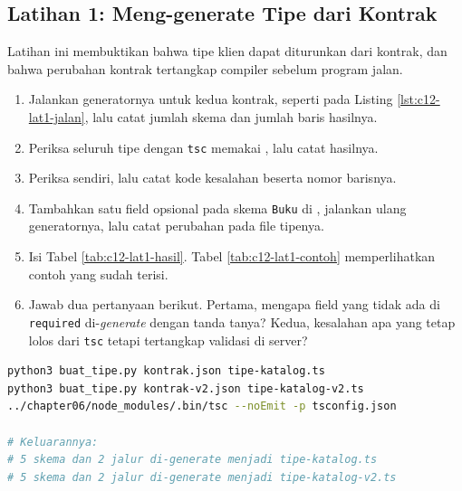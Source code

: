 \subsection*{Latihan 1: Meng-generate Tipe dari Kontrak}

Latihan ini membuktikan bahwa tipe klien dapat diturunkan dari kontrak, dan
bahwa perubahan kontrak tertangkap compiler sebelum program jalan.

\begin{enumerate}
  \item Jalankan generatornya untuk kedua kontrak, seperti pada Listing
        \ref{lst:c12-lat1-jalan}, lalu catat jumlah skema dan jumlah baris
        hasilnya.
  \item Periksa seluruh tipe dengan \texttt{tsc} memakai
        , lalu catat hasilnya.
  \item Periksa  sendiri, lalu catat kode
        kesalahan beserta nomor barisnya.
  \item Tambahkan satu field opsional pada skema \texttt{Buku} di
        , jalankan ulang generatornya, lalu catat
        perubahan pada file tipenya.
  \item Isi Tabel \ref{tab:c12-lat1-hasil}. Tabel \ref{tab:c12-lat1-contoh}
        memperlihatkan contoh yang sudah terisi.
  \item Jawab dua pertanyaan berikut. Pertama, mengapa field yang tidak ada
        di \texttt{required} di-\textit{generate} dengan tanda tanya? Kedua,
        kesalahan apa yang tetap lolos dari \texttt{tsc} tetapi tertangkap
        validasi di server?
\end{enumerate}

\begin{lstlisting}[language=bash, caption={Meng-generate tipe lalu memeriksanya, tersedia di \berkas{sources/chapter12/buat\_tipe.py}}, label={lst:c12-lat1-jalan}]
python3 buat_tipe.py kontrak.json tipe-katalog.ts
python3 buat_tipe.py kontrak-v2.json tipe-katalog-v2.ts
../chapter06/node_modules/.bin/tsc --noEmit -p tsconfig.json

# Keluarannya:
# 5 skema dan 2 jalur di-generate menjadi tipe-katalog.ts
# 5 skema dan 2 jalur di-generate menjadi tipe-katalog-v2.ts
\end{lstlisting}

